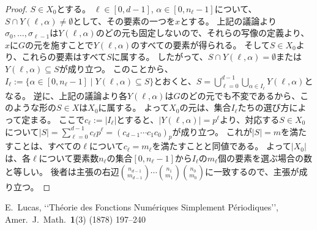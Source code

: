 ﻿\documentclass{ltjsarticle}
\theoremstyle{definition}
\begin{document}
\begin{proof}
    $S \in X_0$とする。
    $\ell \in [0,d-1]$, $\alpha \in [0,n_{\ell}-1]$について、$S \cap Y(\ell,\alpha) \neq \emptyset$として、その要素の一つを$x$とする。
    上記の議論より$\sigma_0,\dots,\sigma_{\ell-1}$は$Y(\ell,\alpha)$のどの元も固定しないので、それらの写像の定義より、
    $x$に$G$の元を施すことで$Y(\ell,\alpha)$のすべての要素が得られる。
    そして$S \in X_0$より、これらの要素はすべて$S$に属する。
    したがって、$S \cap Y(\ell,\alpha) = \emptyset$または$Y(\ell,\alpha) \subseteq S$が成り立つ。
    このことから、$I_{\ell} := \{ \alpha \in [0,n_{\ell}-1] \mid Y(\ell,\alpha) \subseteq S \}$とおくと、$S = \bigcup_{\ell=0}^{d-1} \bigcup_{\alpha \in I_{\ell}} Y(\ell,\alpha)$となる。
    逆に、上記の議論より各$Y(\ell,\alpha)$は$G$のどの元でも不変であるから、このような形の$S \in X$は$X_0$に属する。
    よって$X_0$の元は、集合$I_{\ell}$たちの選び方によって定まる。
    ここで$c_{\ell} := |I_{\ell}|$とすると、$|Y(\ell,\alpha)| = p^{\ell}$より、対応する$S \in X_0$について$|S| = \sum_{\ell=0}^{d-1} c_{\ell} p^{\ell} = (c_{d-1} \cdots c_1 c_0)_p$が成り立つ。
    これが$|S| = m$を満たすことは、すべての$\ell$について$c_{\ell} = m_{\ell}$を満たすことと同値である。
    よって$|X_0|$は、各$\ell$について要素数$n_{\ell}$の集合$[0,n_{\ell}-1]$から$I_{\ell}$の$m_{\ell}$個の要素を選ぶ場合の数と等しい。
    後者は主張の右辺$\binom{ n_{d-1} }{ m_{d-1} } \cdots \binom{ n_1 }{ m_1 } \binom{ n_0 }{ m_0 }$に一致するので、主張が成り立つ。
\end{proof}


\begin{thebibliography}{9}

    E.~Lucas,
    \lq\lq Th\'{e}orie des Fonctions Num\'{e}riques Simplement P\'{e}riodiques\rq\rq,
    Amer.\ J.\ Math.\ \textbf{1}(3) (1878) 197--240

\end{thebibliography}
\end{document}
